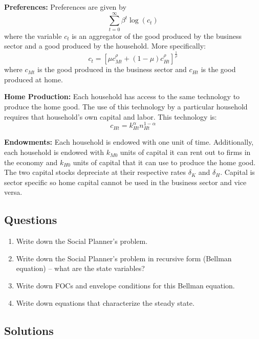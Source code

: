\documentclass[10pt, a4paper]{article}
\begin{document}
    \textbf{Preferences:} Preferences are given by
    \begin{equation*}
    \sum_{t=0}^{\infty} \beta^t \log(c_t)
    \end{equation*}
    where the variable $c_t$ is an aggregator of the good produced by the business sector and a good produced by the household. More specifically:
    \begin{equation*}
    c_t = [\mu c_{Mt}^\rho + (1-\mu)c_{Ht}^\rho]^{\frac{1}{\rho}}
    \end{equation*}
    where $c_{Mt}$ is the good produced in the business sector and $c_{Ht}$ is the good produced at home.

    \textbf{Home Production:} Each household has access to the same technology to produce the home good. The use of this technology by a particular household requires that household's own capital and labor. This technology is:
    \begin{equation*}
    c_{Ht} = k_{Ht}^\alpha n_{Ht}^{1-\alpha}
    \end{equation*}

    \textbf{Endowments:} Each household is endowed with one unit of time. Additionally, each household is endowed with $k_{M0}$ units of capital it can rent out to firms in the economy and $k_{H0}$ units of capital that it can use to produce the home good. The two capital stocks depreciate at their respective rates $\delta_K$ and $\delta_H$. Capital is sector specific so home capital cannot be used in the business sector and vice versa.

  \subsection*{Questions}
    \begin{enumerate}
    \item Write down the Social Planner's problem.
    \item Write down the Social Planner's problem in recursive form (Bellman equation) – what are the state variables?
    \item Write down FOCs and envelope conditions for this Bellman equation.
    \item Write down equations that characterize the steady state.
    \end{enumerate}
  \subsection*{Solutions}
\end{document}
